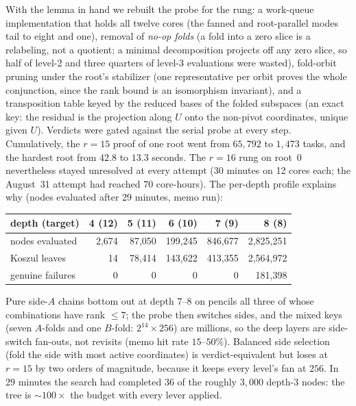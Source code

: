 \documentclass[11pt]{article}
\theoremstyle{definition}
\begin{document}
With the lemma in hand we rebuilt the probe for the rung: a work-queue
implementation that holds all twelve cores (the fanned and root-parallel
modes tail to eight and one), removal of \emph{no-op folds} (a fold into
a zero slice is a relabeling, not a quotient; a minimal decomposition
projects off any zero slice, so half of level-2 and three quarters of
level-3 evaluations were wasted), fold-orbit pruning under the root's
stabilizer (one representative per orbit proves the whole conjunction,
since the rank bound is an isomorphism invariant), and a transposition
table keyed by the reduced bases of the folded subspaces (an exact key:
the residual is the projection along $U$ onto the non-pivot coordinates,
unique given $U$). Verdicts were gated against the serial probe at every
step. Cumulatively, the $r=15$ proof of one root went from $65{,}792$ to
$1{,}473$ tasks, and the hardest root from $42.8$ to $13.3$ seconds.
The $r=16$ rung on root~$0$ nevertheless stayed unresolved at every
attempt (30 minutes on 12 cores each; the August~31 attempt had reached 70
core-hours). The per-depth profile explains why
(nodes evaluated after 29 minutes, memo run):
\begin{center}
\begin{tabular}{@{}lrrrrr@{}}
\toprule
depth (target) & 4 (12) & 5 (11) & 6 (10) & 7 (9) & 8 (8) \\
\midrule
nodes evaluated & 2{,}674 & 87{,}050 & 199{,}245 & 846{,}677 & 2{,}825{,}251 \\
Koszul leaves & 14 & 78{,}414 & 143{,}622 & 413{,}355 & 2{,}564{,}972 \\
genuine failures & 0 & 0 & 0 & 0 & 181{,}398 \\
\bottomrule
\end{tabular}
\end{center}
Pure side-$A$ chains bottom out at depth $7$--$8$ on pencils all three of
whose combinations have rank $\le 7$; the probe then switches sides, and
the mixed keys (seven $A$-folds and one $B$-fold: $2^{14}\times 256$) are
millions, so the deep layers are side-switch fan-outs, not revisits
(memo hit rate $15$--$50\%$). Balanced side selection (fold the side with
most active coordinates) is verdict-equivalent but loses at $r=15$ by two
orders of magnitude, because it keeps every level's fan at $256$.
In 29 minutes the search had completed $36$ of the roughly $3{,}000$
depth-3 nodes: the tree is $\sim 100\times$ the budget with every lever
applied.
\end{document}

